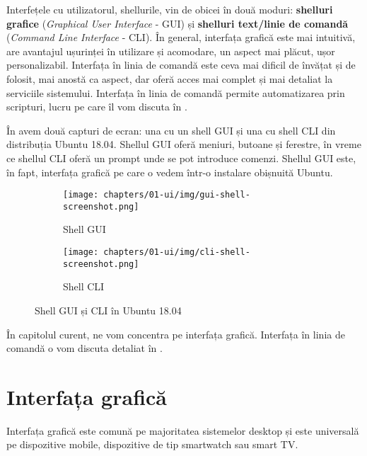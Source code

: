Interfețele cu utilizatorul, shellurile, vin de obicei în două moduri: \textbf{shelluri grafice} (\textit{Graphical User Interface} - GUI) și \textbf{shelluri text/linie de comandă} (\textit{Command Line Interface} - CLI). În general, interfața grafică este mai intuitivă, are avantajul ușurinței în utilizare și acomodare, un aspect mai plăcut, ușor personalizabil. Interfața în linia de comandă este ceva mai dificil de învățat și de folosit, mai anostă ca aspect, dar oferă acces mai complet și mai detaliat la serviciile sistemului. Interfața în linia de comandă permite automatizarea prin scripturi, lucru pe care îl vom discuta în .

În  avem două capturi de ecran: una cu un shell GUI și una cu shell CLI din distribuția Ubuntu 18.04. Shellul GUI oferă meniuri, butoane și ferestre, în vreme ce shellul CLI oferă un prompt unde se pot introduce comenzi. Shellul GUI este, în fapt, interfața grafică pe care o vedem într-o instalare obișnuită Ubuntu.

\begin{figure}[htbp]
  \centering
  \begin{subfigure}[b]{0.6\textwidth}
    \texttt{[image: chapters/01-ui/img/gui-shell-screenshot.png]}
    \caption{Shell GUI}
    \label{fig:ui:shell-gui-cli:gui}
  \end{subfigure}

  \begin{subfigure}[b]{0.6\textwidth}
    \texttt{[image: chapters/01-ui/img/cli-shell-screenshot.png]}
    \caption{Shell CLI}
    \label{fig:ui:shell-gui-cli:cli}
  \end{subfigure}

  \caption{Shell GUI și CLI în Ubuntu 18.04}
  \label{fig:ui:shell-gui-cli}
\end{figure}

În capitolul curent, ne vom concentra pe interfața grafică. Interfața în linia de comandă o vom discuta detaliat în .

\section{Interfața grafică}
\label{sec:ui:gui}

Interfața grafică este comună pe majoritatea sistemelor desktop și este universală pe dispozitive mobile, dispozitive de tip smartwatch sau smart TV.

